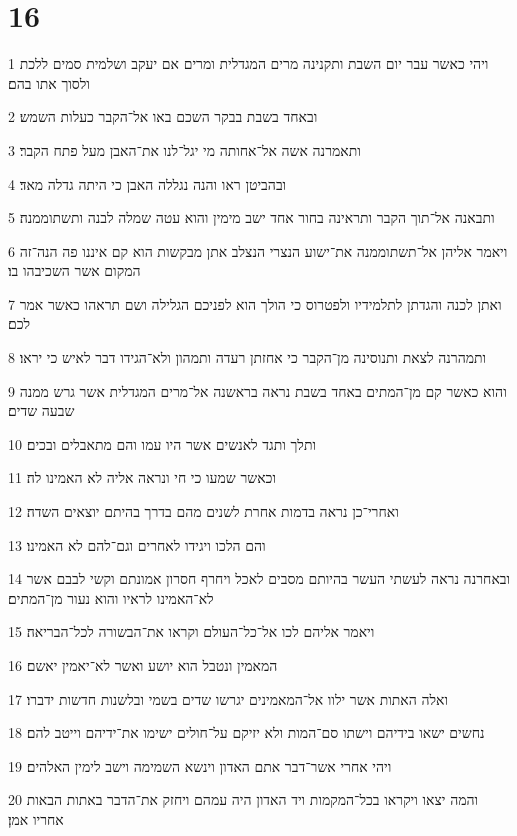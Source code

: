 \chapter{16}

\par 1 ויהי כאשר עבר יום השבת ותקנינה מרים המגדלית ומרים אם יעקב ושלמית סמים ללכת ולסוך אתו בהם׃
\par 2 ובאחד בשבת בבקר השכם באו אל־הקבר כעלות השמש׃
\par 3 ותאמרנה אשה אל־אחותה מי יגל־לנו את־האבן מעל פתח הקבר׃
\par 4 ובהביטן ראו והנה נגללה האבן כי היתה גדלה מאד׃
\par 5 ותבאנה אל־תוך הקבר ותראינה בחור אחד ישב מימין והוא עטה שמלה לבנה ותשתוממנה׃
\par 6 ויאמר אליהן אל־תשתוממנה את־ישוע הנצרי הנצלב אתן מבקשות הוא קם איננו פה הנה־זה המקום אשר השכיבהו בו׃
\par 7 ואתן לכנה והגדתן לתלמידיו ולפטרוס כי הולך הוא לפניכם הגלילה ושם תראהו כאשר אמר לכם׃
\par 8 ותמהרנה לצאת ותנוסינה מן־הקבר כי אחזתן רעדה ותמהון ולא־הגידו דבר לאיש כי יראו׃
\par 9 והוא כאשר קם מן־המתים באחד בשבת נראה בראשנה אל־מרים המגדלית אשר גרש ממנה שבעה שדים׃
\par 10 ותלך ותגד לאנשים אשר היו עמו והם מתאבלים ובכים׃
\par 11 וכאשר שמעו כי חי ונראה אליה לא האמינו לה׃
\par 12 ואחרי־כן נראה בדמות אחרת לשנים מהם בדרך בהיתם יוצאים השדה׃
\par 13 והם הלכו ויגידו לאחרים וגם־להם לא האמינו׃
\par 14 ובאחרנה נראה לעשתי העשר בהיותם מסבים לאכל ויחרף חסרון אמונתם וקשי לבבם אשר לא־האמינו לראיו והוא נעור מן־המתים׃
\par 15 ויאמר אליהם לכו אל־כל־העולם וקראו את־הבשורה לכל־הבריאה׃
\par 16 המאמין ונטבל הוא יושע ואשר לא־יאמין יאשם׃
\par 17 ואלה האתות אשר ילוו אל־המאמינים יגרשו שדים בשמי ובלשנות חדשות ידברו׃
\par 18 נחשים ישאו בידיהם וישתו סם־המות ולא יזיקם על־חולים ישימו את־ידיהם וייטב להם׃
\par 19 ויהי אחרי אשר־דבר אתם האדון וינשא השמימה וישב לימין האלהים׃
\par 20 והמה יצאו ויקראו בכל־המקמות ויד האדון היה עמהם ויחזק את־הדבר באתות הבאות אחריו אמן׃



